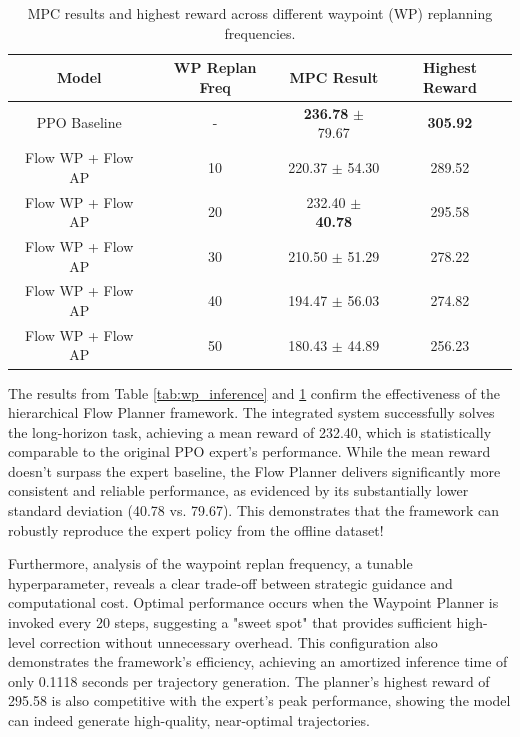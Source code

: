 \begin{table}[H]
\centering
\caption{MPC results and highest reward across different waypoint (WP) replanning frequencies.}
\label{tab:wp_mpc}
\begin{tabular}{|c|c|c|c|}
\hline
\textbf{Model} & \textbf{WP Replan Freq} & \textbf{MPC Result} & \textbf{Highest Reward} \\
\hline
PPO Baseline & - & \textbf{236.78} $\pm$ 79.67 & \textbf{305.92} \\
\hline
Flow WP + Flow AP & 10 & 220.37 $\pm$ 54.30 & 289.52 \\
\hline
Flow WP + Flow AP & 20 & 232.40 $\pm$ \textbf{40.78} & 295.58 \\
\hline
Flow WP + Flow AP & 30 & 210.50 $\pm$ 51.29 & 278.22 \\
\hline
Flow WP + Flow AP & 40 & 194.47 $\pm$ 56.03 & 274.82 \\
\hline
Flow WP + Flow AP & 50 & 180.43 $\pm$ 44.89 & 256.23 \\
\hline
\end{tabular}
\end{table}

The results from Table \ref{tab:wp_inference} and \ref{tab:wp_mpc} confirm the effectiveness of the hierarchical Flow Planner framework. The integrated system successfully solves the long-horizon task, achieving a mean reward of 232.40, which is statistically comparable to the original PPO expert's performance. While the mean reward doesn't surpass the expert baseline, the Flow Planner delivers significantly more consistent and reliable performance, as evidenced by its substantially lower standard deviation (40.78 vs. 79.67). This demonstrates that the framework can robustly reproduce the expert policy from the offline dataset!

Furthermore, analysis of the waypoint replan frequency, a tunable hyperparameter, reveals a clear trade-off between strategic guidance and computational cost. Optimal performance occurs when the Waypoint Planner is invoked every 20 steps, suggesting a "sweet spot" that provides sufficient high-level correction without unnecessary overhead. This configuration also demonstrates the framework's efficiency, achieving an amortized inference time of only 0.1118 seconds per trajectory generation. The planner's highest reward of 295.58 is also competitive with the expert's peak performance, showing the model can indeed generate high-quality, near-optimal trajectories.




